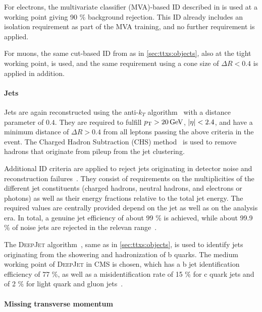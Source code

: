 For electrons, the multivariate classifier (MVA)-based ID described in  is used at a working point giving 90 \% background rejection. This ID already includes an isolation requirement as part of the MVA training, and no further requirement is applied.

For muons, the same cut-based ID from  as in \cref{sec:ttxs:objects}, also at the tight working point, is used, and the same \Irel requirement using a cone size of $\Delta R < 0.4$ is applied in addition.

\paragraph{Jets} 

Jets are again reconstructed using the anti-$k_T$ algorithm~\cite{Cacciari:2008gp} with a distance parameter of $0.4$. They are required to fulfill $\pt > \SI{20}{\GeV}$, $|\eta| < 2.4$, and have a minimum distance of $\Delta R > 0.4$ from all leptons passing the above criteria in the event. The Charged Hadron Subtraction (CHS) method~\cite{CMS:PRF-14-001} is used to remove hadrons that originate from pileup from the jet clustering.

Additional ID criteria are applied to reject jets originating in detector noise and reconstruction failures~\cite{CMS:2020ebo}. They consist of requirements on the multiplicities of the different jet constituents (charged hadrons, neutral hadrons, and electrons or photons) as well as their energy fractions relative to the total jet energy. The required values are centrally provided depend on the jet \abseta as well as on the analysis era. In total, a genuine jet efficiency of about 99 \% is achieved, while about 99.9 \% of noise jets are rejected in the relevan \abseta range~\cite{CMS:2020ebo}.

The \textsc{DeepJet} algorithm~\cite{DeepJet:2020}, same as in \cref{sec:ttxs:objects}, is used to identify jets originating from the showering and hadronization of b quarks. The medium working point of \textsc{DeepJet} in CMS is chosen, which has a b jet identification efficiency of 77 \%, as well as a misidentification rate of 15 \% for c quark jets and of 2 \% for light quark and gluon jets~\cite{CMS:BTV-16-002}.

\paragraph{Missing transverse momentum}

